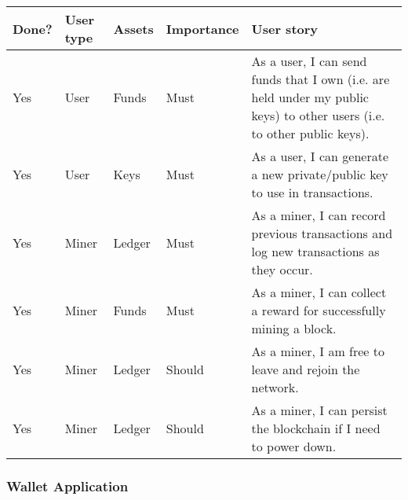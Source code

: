 \documentclass[12pt]{article}
\begin{document}
\begin{tabularx}{\linewidth}{|l|l|l|l|X|}
\hline
\textbf{Done?} & \textbf{User type} & \textbf{Assets} & \textbf{Importance} & \textbf{User story} \\
\hline
Yes & User & Funds & Must & As a user, I can send funds that I own (i.e. are held under my public keys) to other users (i.e. to other public keys). \\
\hline
Yes & User & Keys & Must & As a user, I can generate a new private/public key to use in transactions. \\
\hline
Yes & Miner & Ledger & Must & As a miner, I can record previous transactions and log new transactions as they occur. \\
\hline
Yes & Miner & Funds & Must & As a miner, I can collect a reward for successfully mining a block. \\
\hline
Yes & Miner & Ledger & Should & As a miner, I am free to leave and rejoin the network. \\
\hline
Yes & Miner & Ledger & Should & As a miner, I can persist the blockchain if I need to power down. \\
\hline
\end{tabularx}

\subsubsection*{Wallet Application}
\end{document}
